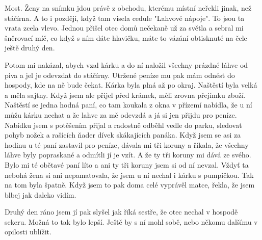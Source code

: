 
Most. Ženy na snímku jdou právě z obchodu, kterému místní neřekli
jinak, než stáčírna. A to i později, když tam visela cedule "Lahvové
nápoje". To jsou ta vrata zcela vlevo. Jednou přišel otec domů
nečekaně už za světla a sebral mi šněrovací míč, co když s ním dáte
hlavičku, máte to vázání obtisknuté na čele ještě druhý den.

Potom mi nakázal, abych vzal kárku a do ní naložil všechny prázdné
láhve od piva a jel je odevzdat do stáčírny. Utržené peníze mu pak mám
odnést do hospody, kde na ně bude čekat. Kárka byla plná až po okraj.
Naštěstí byla velká a měla sajtny. Když jsem ale přijel před krámek,
měli zrovna přejímku zboží. Naštěstí se jedna hodná paní, co tam
koukala z okna v přízemí nabídla, že u ní můžu kárku nechat a že lahve
za mě odevzdá a já si jen přijdu pro peníze. Nabídku jsem s potěšením
přijal a radostně odběhl vedle do parku, sledovat pohyb nožek a
rašících ňader dívek skákajících panáka. Když jsem se asi za hodinu u
té paní zastavil pro peníze, dávala mi tři koruny a říkala, že všechny
láhve byly popraskané a odmítli jí je vzít. A že ty tři koruny mi dává
ze svého. Bylo mi té obětavé paní líto a ani ty tři koruny jsem si od
ní nevzal. Vždyť ta nebohá žena si ani nepamatovala, že jsem u ní
nechal i kárku s pumpičkou. Tak na tom byla špatně. Když jsem to pak
doma celé vyprávěl matce, řekla, že jsem blbej jak daleko vidím.

Druhý den ráno jsem jí pak slyšel jak říká sestře, že otec nechal v
hospodě sekeru. Možná to tak bylo lepší. Ještě by s ní mohl sobě, nebo
někomu dalšímu v opilosti ublížit.
